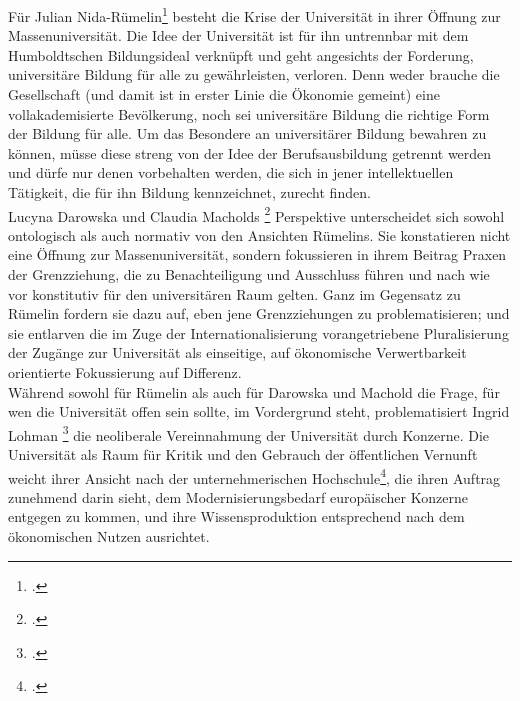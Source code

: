   Für Julian Nida-Rümelin\footnotemark \footcitetext{nida} besteht die Krise
  der Universität in ihrer Öffnung zur Massenuniversität. Die Idee der
  Universität ist für ihn untrennbar mit dem \glqq Humboldtschen Bildungsideal\grqq\footnotemark {} verknüpft und geht angesichts der
Forderung, universitäre Bildung für alle zu gewährleisten, verloren. Denn weder
brauche die Gesellschaft (und damit ist in erster Linie die Ökonomie gemeint)
eine vollakademisierte Bevölkerung, noch sei universitäre Bildung die richtige
Form der Bildung für alle. Um das Besondere an universitärer Bildung bewahren
zu können, müsse diese streng von der Idee der Berufsausbildung getrennt werden
und dürfe nur denen vorbehalten werden, die sich in jener intellektuellen
Tätigkeit, die für ihn Bildung kennzeichnet, zurecht finden.\\
Lucyna Darowska und Claudia Macholds \footnotemark \footcitetext{lucyna} Perspektive unterscheidet sich sowohl ontologisch als
auch normativ von den Ansichten Rümelins. Sie konstatieren nicht eine Öffnung
zur Massenuniversität, sondern fokussieren in ihrem Beitrag Praxen der
Grenzziehung, die zu Benachteiligung und Ausschluss führen und nach wie vor
konstitutiv für den universitären Raum gelten. Ganz im Gegensatz zu Rümelin
fordern sie dazu auf, eben jene Grenzziehungen zu problematisieren; und sie
entlarven die im Zuge der Internationalisierung vorangetriebene Pluralisierung
der Zugänge zur Universität als einseitige, auf ökonomische Verwertbarkeit
orientierte Fokussierung auf Differenz.\\
Während sowohl für Rümelin als auch
für Darowska und Machold die Frage, für wen die Universität offen sein sollte,
im Vordergrund steht, problematisiert Ingrid Lohman \footnotemark
\footcitetext{lohman} die neoliberale
Vereinnahmung der Universität durch Konzerne. Die Universität als Raum für
Kritik und den Gebrauch der öffentlichen Vernunft weicht ihrer Ansicht nach der
\glqq unternehmerischen Hochschule\grqq\footnotemark \footcitetext{lohmein}, die ihren Auftrag zunehmend darin sieht, dem
Modernisierungsbedarf europäischer Konzerne entgegen zu kommen, und ihre
Wissensproduktion entsprechend nach dem ökonomischen Nutzen ausrichtet. 

